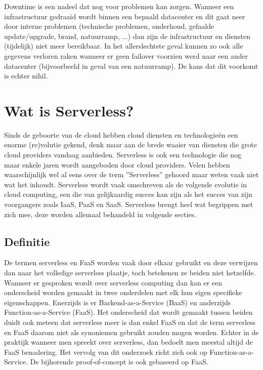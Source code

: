 \begin{description}[style=unboxed, labelwidth=\linewidth, listparindent =0pt]
        \item [Downtime]
        Downtime is een nadeel dat nog voor problemen kan zorgen. Wanneer een infrastructuur gedraaid wordt binnen een bepaald datacenter en dit gaat neer door interne problemen (technische problemen, onderhoud, gefaalde update/upgrade, brand, natuurramp, ...) dan zijn de infrastructuur en diensten (tijdelijk) niet meer bereikbaar. In het allerslechtste geval kunnen zo ook alle gegevens verloren raken wanneer er geen failover voorzien werd naar een ander datacenter (bijvoorbeeld in geval van een natuurramp). De kans dat dit voorkomt is echter nihil.
\end{description}
\newpage

\section{Wat is Serverless?}
Sinds de geboorte van de cloud hebben cloud diensten en technologieën een enorme (re)volutie gekend, denk maar aan de brede waaier van diensten die grote cloud providers vandaag aanbieden. Serverless  is ook een technologie die nog maar enkele jaren wordt aangeboden door cloud providers. Velen hebben waarschijnlijk wel al eens over de term ''Serverless'' gehoord maar weten vaak niet wat het inhoudt. Serverless wordt vaak omschreven als de volgende evolutie in cloud computing, een die van gelijkaardig succes kan zijn als het succes van zijn voorgangers zoals IaaS, PaaS en SaaS. Serverless brengt heel wat begrippen met zich mee, deze worden allemaal behandeld in volgende secties.
 
\subsection{Definitie}
De termen serverless en FaaS worden vaak door elkaar gebruikt en deze verwijzen dan naar het volledige serverless plaatje, toch betekenen ze beiden niet hetzelfde. Wanneer er gesproken wordt over serverless computing dan kan er een onderscheid worden gemaakt in twee onderdelen met elk hun eigen specifieke eigenschappen. Enerzijds is er Backend-as-a-Service (BaaS) en anderzijds Function-as-a-Service (FaaS). Het onderscheid dat wordt gemaakt tussen beiden duidt ook meteen dat serverless meer is dan enkel FaaS en dat de term serverless en FaaS daarom niet als synoniemen gebruikt zouden mogen worden. Echter in de praktijk wanneer men spreekt over serverless, dan bedoelt men meestal altijd de FaaS benadering. Het vervolg van dit onderzoek richt zich ook op Function-as-a-Service. De bijhorende proof-of-concept is ook gebaseerd op FaaS.\autocite{Roberts2017}

